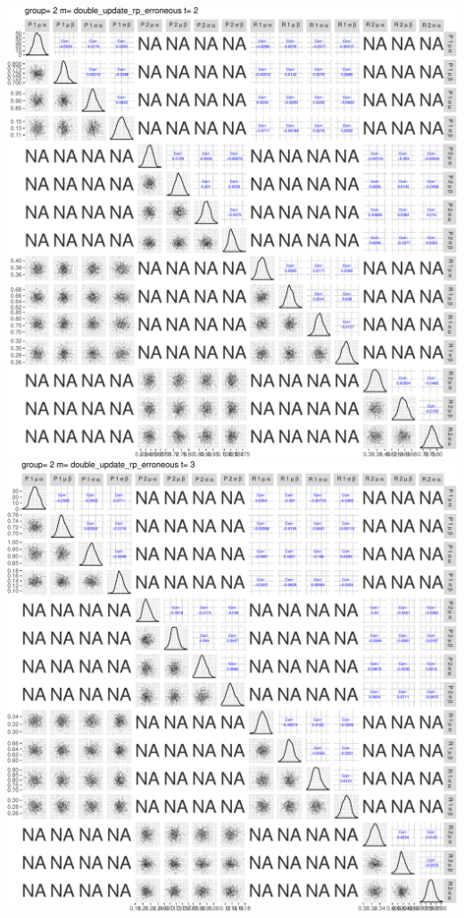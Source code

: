 \documentclass[]{article}
\begin{document}
\includegraphics{compare_models_files/figure-latex/PairsPlots-8.pdf}
\includegraphics{compare_models_files/figure-latex/PairsPlots-9.pdf}
\end{document}
